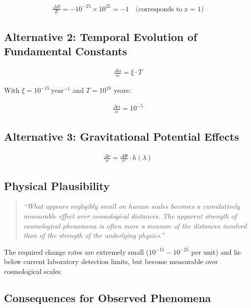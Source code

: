 \documentclass{article}
\begin{document}
	\begin{align}
		\frac{\Delta E}{E} = -10^{-25} \times 10^{25} = -1 \quad \text{(corresponds to z = 1)}
	\end{align}
	
	\subsection{Alternative 2: Temporal Evolution of Fundamental Constants}
	
	\begin{align}
		\frac{\Delta\alpha}{\alpha} = \xi \cdot T
	\end{align}
	
	With $\xi = 10^{-15} \, \text{year}^{-1}$ and $T = 10^{10}$ years:
	
	\begin{align}
		\frac{\Delta\alpha}{\alpha} = 10^{-5}
	\end{align}
	
	\subsection{Alternative 3: Gravitational Potential Effects}
	
	\begin{align}
		\frac{\Delta\nu}{\nu} = \frac{\Delta\Phi}{c^2} \cdot h(\lambda)
	\end{align}
	
	\subsection{Physical Plausibility}
	
	\begin{quote}
		\textit{``What appears negligibly small on human scales becomes a cumulatively measurable effect over cosmological distances. The apparent strength of cosmological phenomena is often more a measure of the distances involved than of the strength of the underlying physics.''}
	\end{quote}
	
	The required change rates are extremely small ($10^{-15} - 10^{-25}$ per unit) and lie below current laboratory detection limits, but become measurable over cosmological scales.
	
	\subsection{Consequences for Observed Phenomena}
	
\end{document}

